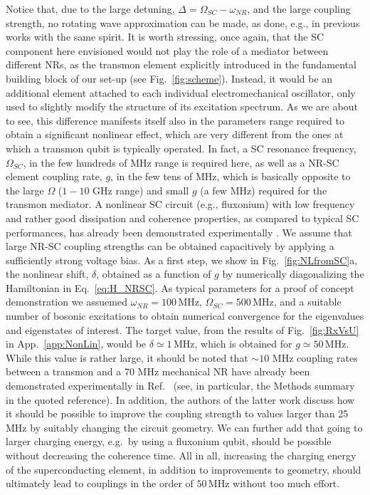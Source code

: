 \documentclass[aps,twocolumn,groupedaddress,superscriptaddress,floatfix,amsmath,amssymb,prb]{revtex4-1}
\begin{document}
Notice that, due to the large detuning, $\Delta = \Omega_{SC}-\omega_{NR}$, and the large coupling strength, no rotating wave approximation can be made, as done, e.g., in previous works with the same spirit\cite{Nori2010}. It is worth stressing, once again, that the SC component here envisioned would not play the role of a mediator between different NRs, as the transmon element explicitly introduced in the fundamental building block of our set-up (see Fig.~\ref{fig:scheme}). Instead, it would be an additional element attached to each individual electromechanical oscillator, only used to slightly modify the structure of its excitation spectrum. As we are about to see, this difference manifests itself also in the parameters range required to obtain a significant nonlinear effect, which are very different from the ones at which a transmon qubit is typically operated. In fact, a SC resonance frequency, $\Omega_{SC}$, in the few hundreds of MHz range is required here, as well as a NR-SC element coupling rate, $g$, in the few tens of MHz, which is basically opposite to the large $\Omega$ ($1-10$ GHz range) and small $g$ (a few MHz) required for the transmon mediator. A nonlinear SC circuit (e.g., fluxonium) with low frequency and rather good dissipation and coherence properties, as compared to typical SC performances, has already been demonstrated experimentally \cite{Pop2014}. We assume that large NR-SC coupling strengths can be obtained capacitively by applying a sufficiently strong voltage bias. As a first step, we show in Fig.~\ref{fig:NLfromSC}a, the nonlinear shift, $\delta$, obtained as a function of $g$ by numerically diagonalizing the Hamiltonian in Eq.~\eqref{eq:H_NRSC}. As typical parameters for a proof of concept demonstration we assuemed $\omega_{NR}  = 100\,$MHz, $\Omega_{SC} = 500\,$MHz, and a suitable number of bosonic excitations to obtain numerical convergence for the eigenvalues and eigenstates of interest. The target value, from the results of Fig.~\ref{fig:RxVsU} in App.~\ref{app:NonLin}, would be $\delta \simeq 1\,$MHz, which is obtained for $g  \simeq50\,$MHz. While this value is rather large, it should be noted that $\sim 10$ MHz coupling rates between a transmon and a 70 MHz mechanical NR have already been demonstrated experimentally in Ref.~ {(see, in particular, the Methods summary in the quoted reference)}. In addition, the authors of the latter work discuss how it should be possible to improve the coupling strength to values larger than 25 MHz by {suitably changing} the circuit geometry. We can further add that going to larger charging energy, e.g.\ by using a fluxonium {qubit}, should be possible without decreasing the coherence time. All in all, increasing the charging energy of the superconducting element, in addition to improvements to geometry, should ultimately lead to couplings in the order of $50\,$MHz without too much effort. \\
\end{document}
